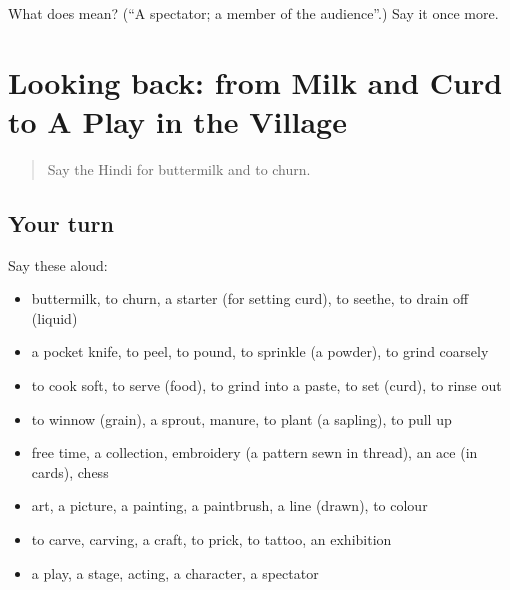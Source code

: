\begin{tcolorbox}[breakable,colback=teal!4,colframe=teal!35!black,title={Before you move on}]
What does  mean? (\textquotedblleft{}A spectator; a member of the audience\textquotedblright{}.) Say it once more.
\end{tcolorbox}
\section[(dialogue)]{Looking back: from Milk and Curd to A Play in the Village}

\label{lesson:HI-R529-review-522-529}



\begin{quote}
Say the Hindi for buttermilk and to churn.
\end{quote}

\subsection*{Your turn}
Say these aloud:

\begin{itemize}
\raggedright
  \item buttermilk, to churn, a starter (for setting curd), to seethe, to drain off (liquid)
  \item a pocket knife, to peel, to pound, to sprinkle (a powder), to grind coarsely
  \item to cook soft, to serve (food), to grind into a paste, to set (curd), to rinse out
  \item to winnow (grain), a sprout, manure, to plant (a sapling), to pull up
  \item free time, a collection, embroidery (a pattern sewn in thread), an ace (in cards), chess
  \item art, a picture, a painting, a paintbrush, a line (drawn), to colour
  \item to carve, carving, a craft, to prick, to tattoo, an exhibition
  \item a play, a stage, acting, a character, a spectator
\end{itemize}

